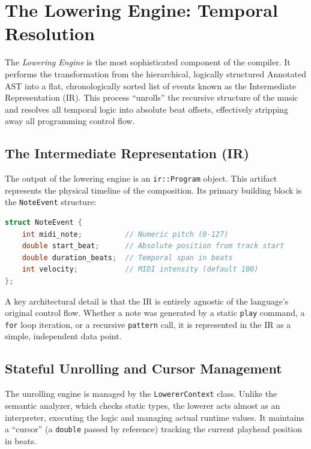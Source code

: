 \section{The Lowering Engine: Temporal Resolution}\label{sec:implementation-lowering}

The \textit{Lowering Engine} is the most sophisticated component of the compiler.
It performs the transformation from the hierarchical, logically structured Annotated AST into a flat, chronologically
sorted list of events known as the Intermediate Representation (IR).
This process ``unrolls'' the recursive structure of the music and resolves all temporal logic into absolute beat
offsets, effectively stripping away all programming control flow.

\subsection{The Intermediate Representation (IR)}\label{subsec:the-intermediate-representation-(ir)}

The output of the lowering engine is an \texttt{ir::Program} object.
This artifact represents the physical timeline of the composition.
Its primary building block is the \texttt{NoteEvent} structure:

\begin{lstlisting}[language=C++, caption={Structure of an atomic IR event.},label={lst:lstlisting2}]
struct NoteEvent {
    int midi_note;          // Numeric pitch (0-127)
    double start_beat;      // Absolute position from track start
    double duration_beats;  // Temporal span in beats
    int velocity;           // MIDI intensity (default 100)
};
\end{lstlisting}

A key architectural detail is that the IR is entirely agnostic of the language's original control flow.
Whether a note was generated by a static \texttt{play} command, a \texttt{for} loop iteration, or a recursive
\texttt{pattern} call, it is represented in the IR as a simple, independent data point.

\subsection{Stateful Unrolling and Cursor Management}\label{subsec:stateful-unrolling-and-cursor-management}

The unrolling engine is managed by the \texttt{LowererContext} class.
Unlike the semantic analyzer, which checks static types, the lowerer acts almost as an interpreter, executing the logic
and managing actual runtime values.
It maintains a ``cursor'' (a \texttt{double} passed by reference) tracking the current playhead position in beats.

